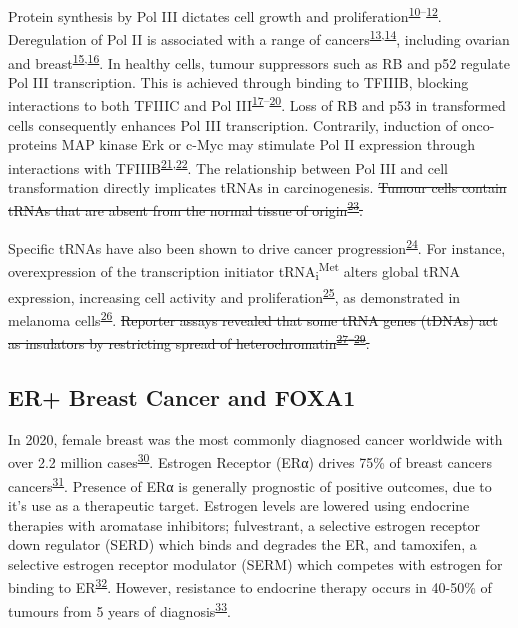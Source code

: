 \documentclass[
  12pt,
]{article}
\begin{document}
Protein synthesis by Pol III dictates cell growth and proliferation\textsuperscript{\protect\hyperlink{ref-Brooks1977}{10}--\protect\hyperlink{ref-Zetterberg1965}{12}}.
Deregulation of Pol II is associated with a range of cancers\textsuperscript{\protect\hyperlink{ref-Zhang2018}{13},\protect\hyperlink{ref-Pavon-Eternod2009}{14}}, including ovarian and breast\textsuperscript{\protect\hyperlink{ref-Winter2000}{15},\protect\hyperlink{ref-Krishnan2016}{16}}.
In healthy cells, tumour suppressors such as RB and p52 regulate Pol III transcription.
This is achieved through binding to TFIIIB, blocking interactions to both TFIIIC and Pol III\textsuperscript{\protect\hyperlink{ref-White1996}{17}--\protect\hyperlink{ref-Crighton2003}{20}}.
Loss of RB and p53 in transformed cells consequently enhances Pol III transcription.
Contrarily, induction of onco-proteins MAP kinase Erk or c-Myc may stimulate Pol II expression through interactions with TFIIIB\textsuperscript{\protect\hyperlink{ref-Gomez-Roman2003}{21},\protect\hyperlink{ref-Felton-Edkins2003}{22}}.
The relationship between Pol III and cell transformation directly implicates tRNAs in carcinogenesis.
\sout{Tumour cells contain tRNAs that are absent from the normal tissue of origin\textsuperscript{\protect\hyperlink{ref-kuchino1978}{23}}.}

Specific tRNAs have also been shown to drive cancer progression\textsuperscript{\protect\hyperlink{ref-Goodarzi2016}{24}}.
For instance, overexpression of the transcription initiator tRNA\textsubscript{i}\textsuperscript{Met} alters global tRNA expression, increasing cell activity and proliferation\textsuperscript{\protect\hyperlink{ref-Pavon-Eternod2013}{25}}, as demonstrated in melanoma cells\textsuperscript{\protect\hyperlink{ref-Birch2016}{26}}.
\sout{Reporter assays revealed that some tRNA genes (tDNAs) act as insulators by restricting spread of heterochromatin\textsuperscript{\protect\hyperlink{ref-raab2011}{27}--\protect\hyperlink{ref-sizer2022}{29}}.}

\hypertarget{er-breast-cancer-and-foxa1}{%
\subsection{ER+ Breast Cancer and FOXA1}\label{er-breast-cancer-and-foxa1}}

In 2020, female breast was the most commonly diagnosed cancer worldwide with over 2.2 million cases\textsuperscript{\protect\hyperlink{ref-Sung2021}{30}}.
Estrogen Receptor (ERα) drives 75\% of breast cancers cancers\textsuperscript{\protect\hyperlink{ref-allred2004}{31}}.
Presence of ERα is generally prognostic of positive outcomes, due to it's use as a therapeutic target.
Estrogen levels are lowered using endocrine therapies with aromatase inhibitors; fulvestrant, a selective estrogen receptor down regulator (SERD) which binds and degrades the ER, and tamoxifen, a selective estrogen receptor modulator (SERM) which competes with estrogen for binding to ER\textsuperscript{\protect\hyperlink{ref-Johnston2018}{32}}.
However, resistance to endocrine therapy occurs in 40-50\% of tumours from 5 years of diagnosis\textsuperscript{\protect\hyperlink{ref-Anurag2018}{33}}.
\end{document}
